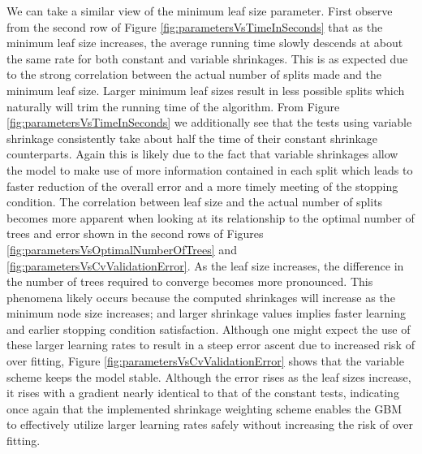\documentclass[9pt, conference]{IEEEtran}
\begin{document}
We can take a similar view of the minimum leaf size parameter. First observe from the second row of Figure \ref{fig:parametersVsTimeInSeconds}  that as the minimum leaf size increases, the average running time slowly descends at about the same rate for both constant and variable shrinkages. This is as expected due to the strong correlation between the actual number of splits made and the minimum leaf size. Larger minimum leaf sizes result in less possible splits which naturally will trim the running time of the algorithm. From Figure \ref{fig:parametersVsTimeInSeconds} we additionally see that the tests using variable shrinkage consistently take about half the time of their constant shrinkage counterparts. Again this is likely due to the fact that variable shrinkages allow the model to make use of more information contained in each split which leads to faster reduction of the overall error and a more timely meeting of the stopping condition. The correlation between leaf size and the actual number of splits becomes more apparent when looking at its relationship to the optimal number of trees and error shown in the second rows of Figures  \ref{fig:parametersVsOptimalNumberOfTrees} and \ref{fig:parametersVsCvValidationError}. As the leaf size increases, the difference in the number of trees required to converge becomes more pronounced. This phenomena likely occurs because the computed shrinkages will increase as the minimum node size increases; and larger shrinkage values implies faster learning and earlier stopping condition satisfaction. Although one might expect the use of these larger learning rates to result in a steep error ascent due to increased risk of over fitting, Figure \ref{fig:parametersVsCvValidationError} shows that the variable scheme keeps the model stable. Although the error rises as the leaf sizes increase, it rises with a gradient nearly identical to that of the constant tests, indicating once again that the implemented shrinkage weighting scheme enables the GBM to effectively utilize larger learning rates safely without increasing the risk of over fitting.
 
\end{document}
